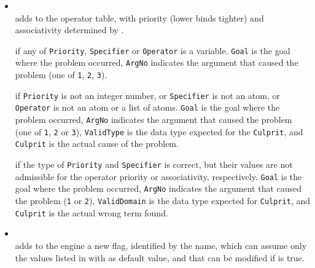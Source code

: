 \begin{itemize}

\item {}\\
     \noindent{} adds 
     to the operator table, with priority (lower binds tighter)
      and associativity determined by .


     if any of \texttt{Priority}, \texttt{Specifier} or \texttt{Operator} is a variable. \texttt{Goal} is the goal where the problem occurred, \texttt{ArgNo} indicates the argument that caused the problem (one of \texttt{1}, \texttt{2}, \texttt{3}).

     if \texttt{Priority} is not an integer number, or \texttt{Specifier} is not an atom, or \texttt{Operator} is not an atom or a list of atoms. \texttt{Goal} is the goal where the problem occurred, \texttt{ArgNo} indicates the argument that caused the problem (one of \texttt{1}, \texttt{2} or \texttt{3}), \texttt{ValidType} is the data type expected for the \texttt{Culprit}, and \texttt{Culprit} is the actual cause of the problem.

     if the type of \texttt{Priority} and \texttt{Specifier} is correct, but their values are not admissible for the operator priority or associativity, respectively. \texttt{Goal} is the goal where the problem occurred, \texttt{ArgNo} indicates the argument that caused the problem (\texttt{1} or \texttt{2}), \texttt{ValidDomain} is the data type expected for \texttt{Culprit}, and \texttt{Culprit} is the actual wrong term found.

\item {}\\
     \noindent{}
     adds to the engine a new flag, identified by the  name, which can assume only the values listed in  with  as default value, and that can be modified if  is true.


\end{itemize}
